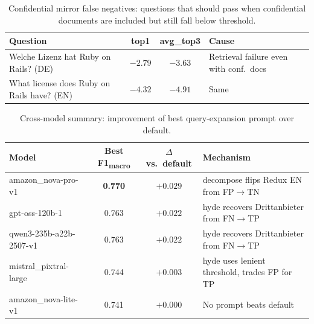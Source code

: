 \begin{table}[htbp]
\centering
\caption{Confidential mirror false negatives: questions that should pass when confidential documents are included but still fall below threshold.}
\label{tab:cg-mirror-fn}
\begin{tabular}{lccl}
\toprule
Question & top1 & avg\_top3 & Cause \\
\midrule
Welche Lizenz hat Ruby on Rails? (DE)   & $-2.79$ & $-3.63$ & Retrieval failure even with conf.\ docs \\
What license does Ruby on Rails have? (EN) & $-4.32$ & $-4.91$ & Same \\
\bottomrule
\end{tabular}
\end{table}



\begin{table}[htbp]
\centering
\caption{Cross-model summary: improvement of best query-expansion prompt over default.}
\label{tab:cg-cross-model}
\begin{tabular}{lccp{5.5cm}}
\toprule
Model & Best F1\textsubscript{macro} & $\Delta$ vs.\ default & Mechanism \\
\midrule
amazon\_nova-pro-v1        & \textbf{0.770} & $+0.029$ & decompose flips Redux EN from FP$\to$TN \\
gpt-oss-120b-1             & 0.763          & $+0.022$ & hyde recovers Drittanbieter from FN$\to$TP \\
qwen3-235b-a22b-2507-v1   & 0.763          & $+0.022$ & hyde recovers Drittanbieter from FN$\to$TP \\
mistral\_pixtral-large      & 0.744          & $+0.003$ & hyde uses lenient threshold, trades FP for TP \\
amazon\_nova-lite-v1       & 0.741          & $+0.000$ & No prompt beats default \\
\bottomrule
\end{tabular}
\end{table}



